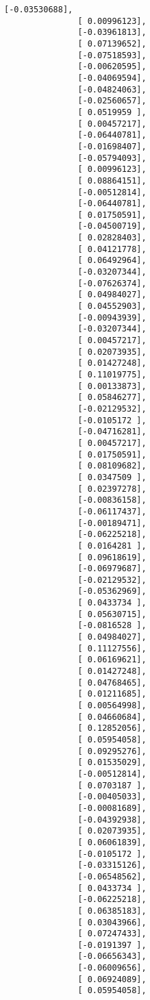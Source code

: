\documentclass[11pt]{article}
\begin{document}
\begin{Verbatim}[commandchars=\\\{\}]
               [-0.03530688],
               [ 0.00996123],
               [-0.03961813],
               [ 0.07139652],
               [-0.07518593],
               [-0.00620595],
               [-0.04069594],
               [-0.04824063],
               [-0.02560657],
               [ 0.0519959 ],
               [ 0.00457217],
               [-0.06440781],
               [-0.01698407],
               [-0.05794093],
               [ 0.00996123],
               [ 0.08864151],
               [-0.00512814],
               [-0.06440781],
               [ 0.01750591],
               [-0.04500719],
               [ 0.02828403],
               [ 0.04121778],
               [ 0.06492964],
               [-0.03207344],
               [-0.07626374],
               [ 0.04984027],
               [ 0.04552903],
               [-0.00943939],
               [-0.03207344],
               [ 0.00457217],
               [ 0.02073935],
               [ 0.01427248],
               [ 0.11019775],
               [ 0.00133873],
               [ 0.05846277],
               [-0.02129532],
               [-0.0105172 ],
               [-0.04716281],
               [ 0.00457217],
               [ 0.01750591],
               [ 0.08109682],
               [ 0.0347509 ],
               [ 0.02397278],
               [-0.00836158],
               [-0.06117437],
               [-0.00189471],
               [-0.06225218],
               [ 0.0164281 ],
               [ 0.09618619],
               [-0.06979687],
               [-0.02129532],
               [-0.05362969],
               [ 0.0433734 ],
               [ 0.05630715],
               [-0.0816528 ],
               [ 0.04984027],
               [ 0.11127556],
               [ 0.06169621],
               [ 0.01427248],
               [ 0.04768465],
               [ 0.01211685],
               [ 0.00564998],
               [ 0.04660684],
               [ 0.12852056],
               [ 0.05954058],
               [ 0.09295276],
               [ 0.01535029],
               [-0.00512814],
               [ 0.0703187 ],
               [-0.00405033],
               [-0.00081689],
               [-0.04392938],
               [ 0.02073935],
               [ 0.06061839],
               [-0.0105172 ],
               [-0.03315126],
               [-0.06548562],
               [ 0.0433734 ],
               [-0.06225218],
               [ 0.06385183],
               [ 0.03043966],
               [ 0.07247433],
               [-0.0191397 ],
               [-0.06656343],
               [-0.06009656],
               [ 0.06924089],
               [ 0.05954058],

\end{Verbatim}
\end{document}
